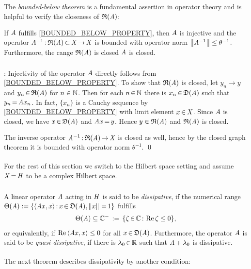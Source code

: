 \documentclass[11pt,twoside]{article}
\begin{document}
\subparagraph{} %
The \textit{bounded-below theorem} is a fundamental assertion
in operator theory and is helpful to verify the closeness of $\mathfrak{R}(\mathit{A})$:

\begin{theorem}\label{BOUNDED_BELOW_THEOREM}
If $\mathit{A}$ fulfills \eqref{BOUNDED_BELOW_PROPERTY},
then $\mathit{A}$ is injective and the operator
$\mathit{A}^{-1} {\,:\,} \mathfrak{R}(\mathit{A}) {\,\subset\,} \mathit{X} {\,\to\,} \mathit{X}$ is bounded
with operator norm $\left\lVert \mathit{A}^{-1} \right\rVert \leq \theta^{-1}$.
Furthermore,
the range $\mathfrak{R}(\mathit{A})$ is closed \iff $\mathit{A}$ is closed.
\end{theorem}

\subparagraph{}
\Proof:
Injectivity of the operator $\mathit{A}$ directly follows
from \eqref{BOUNDED_BELOW_PROPERTY}.
To show that $\mathfrak{R}(\mathit{A})$ is closed,
let $y_n \to y$ and $y_n {\,\in\,} \mathfrak{R}(\mathit{A})$ for $n \in {\mathbb{N}}$.
Then for each $n {\,\in\,} {\mathbb{N}}$
there is $x_n {\,\in\,} \mathfrak{D}(\mathit{A})$ such that $y_n {\,=\,} \mathit{A} x_n$.
In fact,
$\{x_n\}$ is a Cauchy sequence by \eqref{BOUNDED_BELOW_PROPERTY}
with limit element $x {\,\in\,} \mathit{X}$.
Since $\mathit{A}$ is closed,
we have $x {\,\in\,} \mathfrak{D}(\mathit{A})$ and $\mathit{A} x {\,=\,} y$.
Hence $y \in \mathfrak{R}(\mathit{A})$ and $\mathfrak{R}(\mathit{A})$ is closed.

The inverse operator $\mathit{A}^{-1} {\,:\,} \mathfrak{R}(\mathit{A}) {\,\to\,} \mathit{X}$
is closed as well,
hence by the closed graph theorem it is bounded
with operator norm $\theta^{-1}$.
\qed

\paragraph{} %
For the rest of this section we switch to the Hilbert space setting
and assume $\mathit{X} {\,=\,} \mathit{H}$ to be a complex Hilbert space.
 
\subparagraph{}
A linear operator $\mathit{A}$ acting in $\mathit{H}$ is said to be \textit{dissipative},
if the numerical range
$\Theta(\mathit{A}):=\{\langle \mathit{A} x,x \rangle{\,:\,}x {\,\in\,} \mathfrak{D}(\mathit{A}), \left\lVert x \right\rVert {\,=\,} 1\}$
fulfills
\[
\Theta(\mathit{A}) \subseteq {\mathbb{C}}^- \,:=\, \{\zeta {\,\in\,} {\mathbb{C}} {\,:\,} \operatorname{Re} \zeta \leq 0\},
\]
or equivalently,
if $\operatorname{Re} \, \langle \mathit{A} x,x \rangle \leq 0$ for all $x {\,\in\,} \mathfrak{D}(\mathit{A})$.
Furthermore,
the operator $\mathit{A}$ is said to be \textit{quasi-dissipative},
if there is $\lambda_0 {\,\in\,} {\mathbb{R}}$ such that $\mathit{A} + \lambda_0$ is dissipative.

\paragraph{} %
The next theorem describes dissipativity by another condition:
\end{document}
